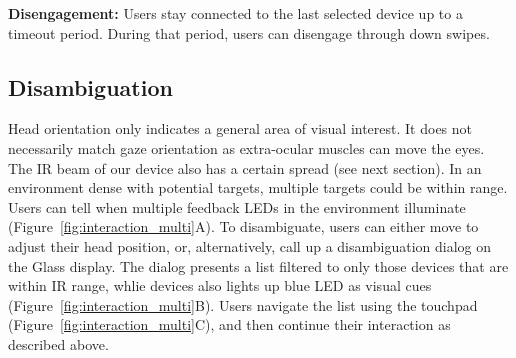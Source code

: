 {\bf Disengagement:} Users stay connected to the last selected device up to a timeout period. During that period, users can disengage through down swipes.

\subsection{Disambiguation}
Head orientation only indicates a general area of visual interest. It does not necessarily match gaze orientation as extra-ocular muscles can move the eyes. The IR beam of our device also has a certain spread (see next section). In an environment dense with potential targets, multiple targets could be within range. Users can tell when multiple feedback LEDs in the environment illuminate (Figure~\ref{fig:interaction_multi}A). To disambiguate, users can either move to adjust their head position, or, alternatively, call up a disambiguation dialog on the Glass display. The dialog presents a list filtered to only those devices that are within IR range, whlie devices also lights up blue LED as visual cues (Figure~\ref{fig:interaction_multi}B). Users navigate the list using the touchpad (Figure~\ref{fig:interaction_multi}C), and then continue their interaction as described above.
